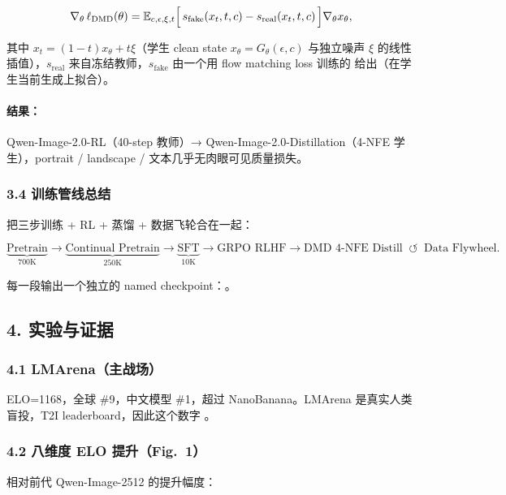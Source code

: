 \[
\nabla_\theta\,\ell_{\text{DMD}}(\theta)
=\mathbb{E}_{c,\epsilon,\xi,t}\Bigl[\,
s_{\text{fake}}(x_t,t,c)
- s_{\text{real}}(x_t,t,c)
\,\Bigr]\nabla_\theta x_\theta,
\]

其中 $x_t=(1-t)x_\theta + t\xi$（学生 clean state $x_\theta=G_\theta(\epsilon,c)$ 与独立噪声 $\xi$ 的线性插值），$s_{\text{real}}$ 来自冻结教师，$s_{\text{fake}}$ 由一个用 flow matching loss 训练的  给出（在学生当前生成上拟合）。

\paragraph{结果：} Qwen-Image-2.0-RL（40-step 教师）→ Qwen-Image-2.0-Distillation（4-NFE 学生），portrait / landscape / 文本几乎无肉眼可见质量损失。

\subsubsection{3.4 训练管线总结}

把三步训练 + RL + 蒸馏 + 数据飞轮合在一起：

\[
\underbrace{\text{Pretrain}}_{700\text{K}}
\rightarrow \underbrace{\text{Continual Pretrain}}_{250\text{K}}
\rightarrow \underbrace{\text{SFT}}_{10\text{K}}
\rightarrow \text{GRPO RLHF}
\rightarrow \text{DMD 4-NFE Distill}
\;\;\circlearrowleft\;\; \text{Data Flywheel}.
\]

每一段输出一个独立的 named checkpoint：。

\subsection{4. 实验与证据}

\subsubsection{4.1 LMArena（主战场）}

ELO=1168，全球 \#9，中文模型 \#1，超过 NanoBanana。LMArena 是真实人类盲投，T2I leaderboard，因此这个数字 。

\subsubsection{4.2 八维度 ELO 提升（Fig.~1）}

相对前代 Qwen-Image-2512 的提升幅度：

